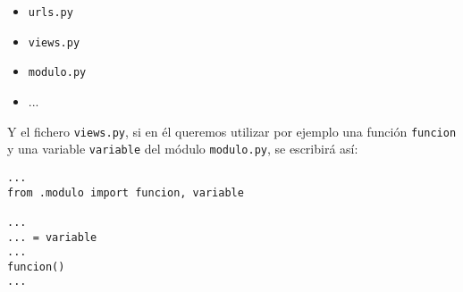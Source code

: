 \begin{itemize}
\item \verb|urls.py|
\item \verb|views.py|
\item \verb|modulo.py|
\item ...
\end{itemize}

Y el fichero \verb|views.py|, si en él queremos utilizar por ejemplo una función \verb|funcion| y una variable \verb|variable| del módulo \verb|modulo.py|, se escribirá así:

\begin{verbatim}
...
from .modulo import funcion, variable

...
... = variable
...
funcion()
...
\end{verbatim}
